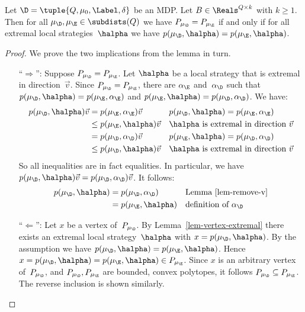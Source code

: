 \begin{lem}\label{lem-check-extremal-enough}
Let $\D = \tuple{Q,\mu_{0},\Label,\delta}$ be an MDP\@.
Let $B \in \Reals^{Q \times k}$ with $k \ge 1$.
Then for all $\mu_\D, \mu_\E \in \subdists(Q)$ we have $P_{\mu_\D} = P_{\mu_\E}$ if and only if for all extremal local strategies~$\halpha$ we have $p(\mu_\D, \halpha) = p(\mu_\E, \halpha)$.
\end{lem}
\begin{proof}
We prove the two implications from the lemma in turn.
\begin{itemize}[align=left]
\item[``$\Longrightarrow$'':]
Suppose $P_{\mu_\D} = P_{\mu_\E}$.
Let $\halpha$ be a local strategy that is extremal in direction~$\vec{v}$.
Since $P_{\mu_\D} = P_{\mu_\E}$, there are $\alpha_{\E}$ and~$\alpha_{\D}$ such that
$p(\mu_\D, \halpha) = p(\mu_\E, \alpha_\E)$ and
$p(\mu_\E, \halpha) = p(\mu_\D, \alpha_\D)$.
We have:
\begin{align*}
p(\mu_\D, \halpha) \vec{v}
& = p(\mu_\E, \alpha_\E) \vec{v}
 && p(\mu_\D, \halpha) = p(\mu_\E, \alpha_\E) \\
& \le p(\mu_\E, \halpha) \vec{v}
 && \text{$\halpha$ is extremal in direction~$\vec{v}$} \\
& = p(\mu_\D, \alpha_\D) \vec{v}
 && \text{$p(\mu_\E, \halpha) = p(\mu_\D, \alpha_\D)$} \\
& \le p(\mu_\D, \halpha) \vec{v}
 && \text{$\halpha$ is extremal in direction~$\vec{v}$}
\end{align*}
So all inequalities are in fact equalities.
In particular, we have $p(\mu_\D, \halpha) \vec{v} = p(\mu_\D, \alpha_\D) \vec{v}$.
It follows:
\begin{align*}
p(\mu_\D, \halpha)
& = p(\mu_\D, \alpha_\D) && \text{Lemma~\ref{lem-remove-v}} \\
& = p(\mu_\E, \halpha)  && \text{definition of~$\alpha_\D$}
\end{align*}
\item[``$\Longleftarrow$'':]
Let $x$ be a vertex of~$P_{\mu_\D}$.
By Lemma~\ref{lem-vertex-extremal} there exists an extremal local strategy~$\halpha$ with $x = p(\mu_\D, \halpha)$.
By the assumption we have $p(\mu_\D, \halpha) = p(\mu_\E, \halpha)$.
Hence $x = p(\mu_\D, \halpha) = p(\mu_\E, \halpha) \in P_{\mu_\E}$.
Since $x$ is an arbitrary vertex of~$P_{\mu_\D}$, and $P_{\mu_\D}, P_{\mu_\E}$ are bounded, convex polytopes, it follows $P_{\mu_\D} \subseteq P_{\mu_\E}$.
The reverse inclusion is shown similarly. \qedhere
\end{itemize}
\end{proof}

